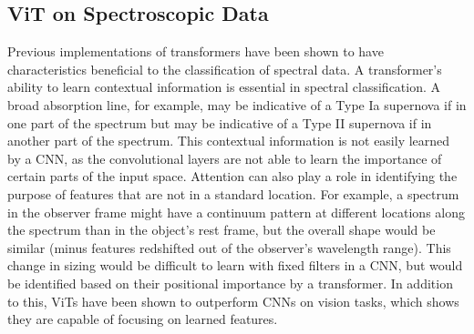 \subsection{ViT on Spectroscopic Data}\label{sec:ViT}
Previous implementations of transformers have been shown to have characteristics 
beneficial to the classification of spectral data. A transformer's 
ability to learn contextual information is essential in spectral classification. 
A broad absorption line, for example, may be indicative of a Type Ia supernova 
if in one part of the spectrum but may be indicative of a Type II supernova if
in another part of the spectrum. This contextual information is not easily learned 
by a CNN, as the convolutional layers are not able to learn the importance of
certain parts of the input space. Attention can also play a role in identifying 
the purpose of features that are not in a standard location. For example, a 
spectrum in the observer frame might have a continuum pattern at different locations 
along the spectrum than in the object's rest frame, but the overall shape would be similar (minus features redshifted out of the observer's wavelength range). This change in sizing 
would be difficult to learn with fixed filters in a CNN, but would be identified 
based on their positional importance by a transformer. In addition to this, ViTs 
have been shown to outperform CNNs on vision tasks, which shows they are capable 
of focusing on learned features. 

